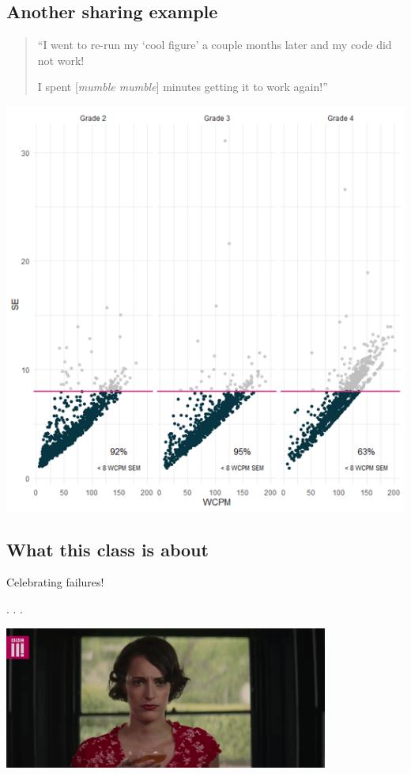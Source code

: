 \documentclass[
  letterpaper,
  DIV=11,
  numbers=noendperiod,
  oneside]{scrartcl}
\begin{document}
\hypertarget{another-sharing-example}{%
\subsection{Another sharing example}\label{another-sharing-example}}

\begin{quote}
``I went to re-run my `cool figure' a couple months later and my code
did not work!

I spent {[}\emph{mumble mumble}{]} minutes getting it to work again!''
\end{quote}

\includegraphics{./images/share_ex.png}

\hypertarget{what-this-class-is-about-1}{%
\subsection{What this class is about}\label{what-this-class-is-about-1}}

Celebrating failures!

. . .

\includegraphics[width=0.8\textwidth,height=\textheight]{w1_intro_files/mediabag/giphy.gif-cid=ecf05e12.gif}
\end{document}
